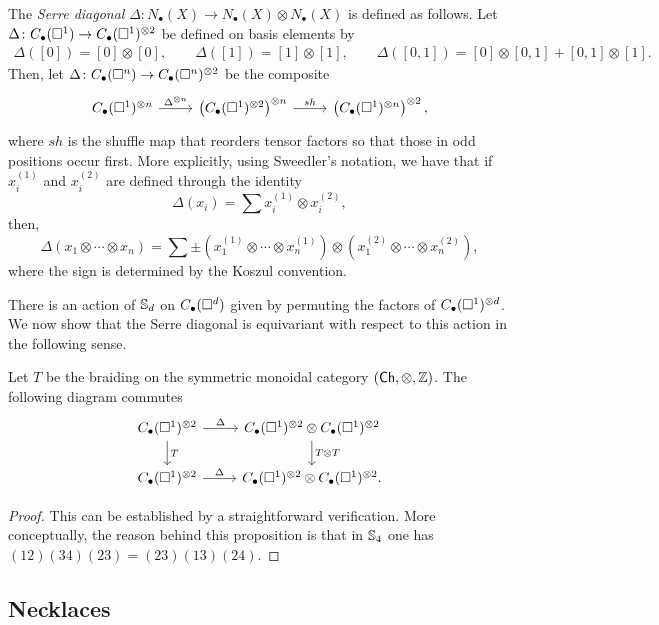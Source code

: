 The \textit{Serre diagonal} $\Delta \colon N_\bullet(X) \to N_\bullet(X) \otimes N_\bullet(X)$ is defined as follows. Let $\Delta \colon \chains(\square^1) \to \chains(\square^1)^{\otimes 2}$ be defined on basis elements by	
\begin{gather*}	
\Delta([0]) = [0] \otimes [0], \qquad 
\Delta([1]) = [1] \otimes [1], \qquad
\Delta([0, 1]) = [0] \otimes [0, 1] + [0, 1] \otimes [1].	
\end{gather*}	
Then, let
$\Delta \colon \chains(\square^n) \to \chains(\square^n)^{\otimes 2}$
be the composite
\begin{equation*}
\begin{tikzcd}
\chains(\square^1)^{\otimes n} \arrow[r, "\Delta^{\otimes n}"] & \left( \chains(\square^1)^{\otimes 2} \right)^{\otimes n} \arrow[r, "sh"] & \left( \chains(\square^1)^{\otimes n} \right)^{\otimes 2},
\end{tikzcd}
\end{equation*}
where $sh$ is the shuffle map that reorders tensor factors so that those in odd positions occur first. More explicitly, using Sweedler's notation, we have that if $x_i^{(1)}$ and $x_i^{(2)}$ are defined through the identity
\begin{equation*}	
\Delta(x_i) = \sum x_i^{(1)} \otimes x_i^{(2)},
\end{equation*}	
then,
\begin{equation} \label{E: Delta}	
\Delta (x_1 \otimes \cdots \otimes x_n) = 	
\sum \pm \left( x_1^{(1)} \otimes \cdots \otimes x_n^{(1)} \right) \otimes 	
\left( x_1^{(2)} \otimes \cdots \otimes x_n^{(2)} \right),
\end{equation}	
where the sign is determined by the Koszul convention.

There is an action of $\S_d$ on $\chains(\square^d)$ given by permuting the factors of $\chains(\square^1)^{\otimes d}$.
We now show that the Serre diagonal is equivariant with respect to this action in the following sense.

\begin{proposition} \label{p:serre diagonal invariant}
	Let $T$ be the braiding on the symmetric monoidal category $(\Ch, \otimes, \Z)$. The following diagram commutes
	\begin{equation*}
	\begin{tikzcd}
	\chains(\square^1)^{\otimes 2} \arrow[r, "\Delta"] \arrow[d, "T"] &
	\chains(\square^1)^{\otimes 2} \otimes \chains(\square^1)^{\otimes 2} \arrow[d, "T \otimes T"] \\
	\chains(\square^1)^{\otimes 2} \arrow[r, "\Delta"] &
	\chains(\square^1)^{\otimes 2} \otimes \chains(\square^1)^{\otimes 2}.
	\end{tikzcd}
	\end{equation*}
\end{proposition}

\begin{proof}
	This can be established by a straightforward verification. More conceptually, the reason behind this proposition is that in $\S_4$ one has $(12)(34)(23) = (23)(13)(24)$.
\end{proof}

\subsection{Necklaces}